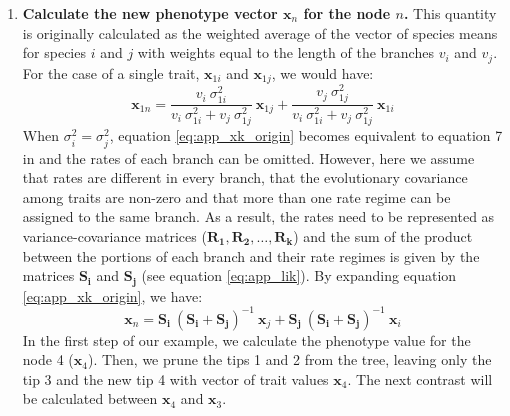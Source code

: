 \begin{enumerate}
\item \textbf{Calculate the new phenotype vector $\mathbf{x}_{n}$ for the node $n$.} This quantity is originally calculated as the weighted average of the vector of species means for species $i$ and $j$ with weights equal to the length of the branches $v_{i}$ and $v_{j}$. For the case of a single trait, $\mathbf{x}_{1i}$ and $\mathbf{x}_{1j}$, we would have:
\begin{equation} \label{eq:app_xk_origin}
\mathbf{x}_{1n} = \frac{v_{i} \: \sigma_{1i}^{2}}{v_{i} \: \sigma_{1i}^{2} + v_{j} \: \sigma_{1j}^{2} } \: \mathbf{x}_{1j} + \frac{v_{j} \: \sigma_{1j}^{2} }{v_{i} \: \sigma_{1i}^{2} + v_{j} \: \sigma_{1j}^{2}} \: \mathbf{x}_{1i}
\end{equation}
When $\sigma_{i}^{2} = \sigma_{j}^{2}$, equation \ref{eq:app_xk_origin} becomes equivalent to equation 7 in \citet{felsenstein_1973} and the rates of each branch can be omitted. However, here we assume that rates are different in every branch, that the evolutionary covariance among traits are non-zero and that more than one rate regime can be assigned to the same branch. As a result, the rates need to be represented as variance-covariance matrices ($ \mathbf{R_1}, \mathbf{R_2}, \ldots, \mathbf{R_k} $) and the sum of the product between the portions of each branch and their rate regimes is given by the matrices $ \mathbf{S_{i}} $ and $\mathbf{S_{j}}$ (see equation \ref{eq:app_lik}). By expanding equation \ref{eq:app_xk_origin}, we have:
\begin{equation} \label{eq:app_xk_mult}
\mathbf{x}_{n} = \mathbf{S_{i}} \: ( \mathbf{S_{i}} + \mathbf{S_{j}} )^{-1} \: \mathbf{x}_{j} + \mathbf{S_{j}} \: ( \mathbf{S_{i}} + \mathbf{S_{j}} )^{-1} \: \mathbf{x}_{i}
\end{equation}
In the first step of our example, we calculate the phenotype value for the node 4 ($\mathbf{x}_{4}$). Then, we prune the tips 1 and 2 from the tree, leaving only the tip 3 and the new tip 4 with vector of trait values $\mathbf{x}_{4}$. The next contrast will be calculated between $\mathbf{x}_{4}$ and $\mathbf{x}_{3}$.


\end{enumerate}
